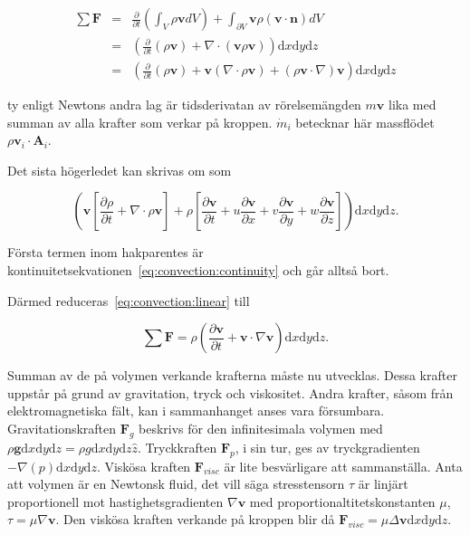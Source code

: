 \begin{eqnarray}
\label{eq:convection:linear}
\sum \mathbf{F} & = & \frac{\partial}{\partial t} \left( \int_V \rho\mathbf{v} dV \right) + \int_{\partial V} \mathbf{v}\rho\left( \mathbf{v} \cdot \mathbf{n}\right)dV \nonumber \\
& = &\left(\frac{\partial}{\partial t} \left( \rho\mathbf{v} \right) + \nabla \cdot \left( \mathbf{v} \rho \mathbf{v}\right)\right)\mathrm{d}x\mathrm{d}y\mathrm{d}z \nonumber\\
& = &\left( \frac{\partial}{\partial t} \left( \rho\mathbf{v} \right) + \mathbf{v}\left(\nabla\cdot\rho\mathbf{v}\right) + \left(\rho\mathbf{v} \cdot \nabla\right) \mathbf{v}\right) \mathrm{d}x\mathrm{d}y\mathrm{d}z
\end{eqnarray}

ty enligt Newtons andra lag är tidsderivatan av rörelsemängden $m\mathbf{v}$ lika med summan av alla krafter som verkar på kroppen. $\dot{m}_i$ betecknar här massflödet $\rho\mathbf{v}_i\cdot\mathbf{A}_i$.

Det sista högerledet kan skrivas om som

\begin{equation}
\left( \mathbf{v}\left[ \frac{\partial \rho}{\partial t} + \nabla\cdot \rho \mathbf{v}\right] + \rho\left[ \frac{\partial \mathbf{v}}{\partial t} + u\frac{\partial\mathbf{v}}{\partial x} + v\frac{\partial\mathbf{v}}{\partial y} + w\frac{\partial\mathbf{v}}{\partial z} \right]\right)\mathrm{d}x\mathrm{d}y\mathrm{d}z.
\end{equation}

Första termen inom hakparentes är kontinuitetsekvationen~\eqref{eq:convection:continuity} och går alltså bort.

Därmed reduceras~\eqref{eq:convection:linear} till

\begin{equation}
\label{eq:convection:linearfinal}
\sum \mathbf{F} = \rho \left( \frac{\partial \mathbf{v}}{\partial t} + \mathbf{v}\cdot \nabla\mathbf{v} \right)\mathrm{d}x\mathrm{d}y\mathrm{d}z.
\end{equation}

Summan av de på volymen verkande krafterna måste nu utvecklas. Dessa krafter uppstår på grund av gravitation, tryck och viskositet. Andra krafter, såsom från elektromagnetiska fält, kan i sammanhanget anses vara försumbara. Gravitationskraften $\mathbf{F}_g$ beskrivs för den infinitesimala volymen med $\rho \mathbf{g} \mathrm{d}x\mathrm{d}y\mathrm{d}z = \rho g \mathrm{d}x\mathrm{d}y\mathrm{d}z \hat{z}$. Tryckkraften $\mathbf{F}_p$, i sin tur, ges av tryckgradienten $-\nabla \left( p \right) \mathrm{d}x\mathrm{d}y\mathrm{d}z$. Viskösa kraften $\mathbf{F}_{visc}$ är lite besvärligare att sammanställa. Anta att volymen är en Newtonsk fluid, det vill säga stresstensorn $\tau$ är linjärt proportionell mot hastighetsgradienten $\nabla\mathbf{v}$ med proportionaltitetskonstanten $\mu$, $\tau = \mu \nabla \mathbf{v}$. Den viskösa kraften verkande på kroppen blir då $\mathbf{F}_{visc} = \mu\Delta\mathbf{v}\mathrm{d}x\mathrm{d}y\mathrm{d}z$.

